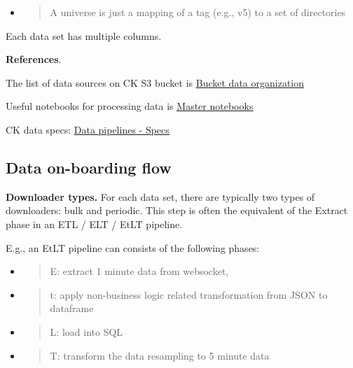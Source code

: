 \documentclass[11pt, reqno]{amsart}
\begin{document}
\begin{itemize}
\item
  \begin{quote}
  A universe is just a mapping of a tag (e.g., v5) to a set of
  directories
  \end{quote}
\end{itemize}

Each data set has multiple columns.

\textbf{References}.

The list of data sources on CK S3 bucket is
\href{https://docs.google.com/document/d/1C-22QF_gOe1k4HgyD6E6iOO_F_FxKKECd4MXaJEuTxo/edit\#heading=h.azfdjheqqtp}{\ul{Bucket
data organization}}

Useful notebooks for processing data is
\href{https://docs.google.com/document/d/17N8OTI1zxXI-l3OYDVcft1spDf0-JPUU8UiNCfBLYvY/edit\#heading=h.uxyv8hg7offz}{\ul{Master
notebooks}}

CK data specs:
\href{https://docs.google.com/document/d/1nLhaFBSHVrexCcwJMnpXlkqwn0l6bDiVer34GKVclYY/edit\#}{\ul{Data
pipelines - Specs}}

\subsection{Data on-boarding flow}

\textbf{Downloader types.} For each data set, there are typically two
types of downloaders: bulk and periodic. This step is often the
equivalent of the Extract phase in an ETL / ELT / EtLT pipeline.

E.g., an EtLT pipeline can consists of the following phases:

\begin{itemize}
\item
  \begin{quote}
  E: extract 1 minute data from websocket,
  \end{quote}
\item
  \begin{quote}
  t: apply non-business logic related transformation from JSON to
  dataframe
  \end{quote}
\item
  \begin{quote}
  L: load into SQL
  \end{quote}
\item
  \begin{quote}
  T: transform the data resampling to 5 minute data
  \end{quote}
\end{itemize}
\end{document}
